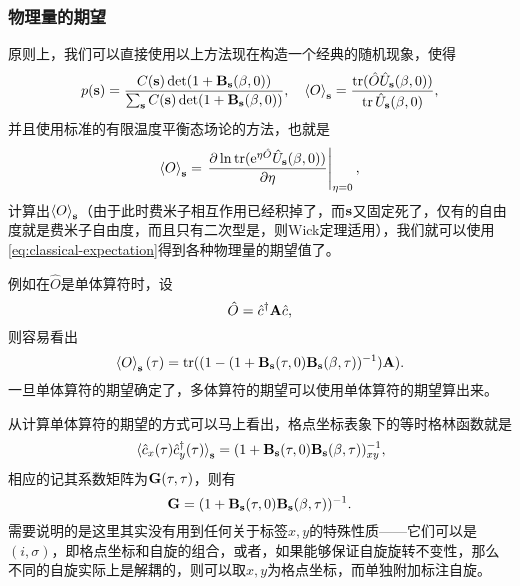 \documentclass[hyperref, UTF8, a4paper]{ctexart}
\newcommand*{\ee}{\mathrm{e}}
\begin{document}
\subsubsection{物理量的期望}

原则上，我们可以直接使用以上方法现在构造一个经典的随机现象，使得
\begin{equation}
    p(\vb{s}) = \frac{ C(\vb{s}) \det(1 + \vb{B}_{\vb{s}}(\beta, 0))}{\sum_{\vb{s}} C(\vb{s}) \det(1 + \vb{B}_{\vb{s}}(\beta, 0))}, \quad \expval{O}_{\vb{s}} = \frac{\trace(\hat{O} \hat{U}_{\vb{s}}(\beta, 0))}{\trace \hat{U}_{\vb{s}}(\beta, 0)},
    \label{eq:ftqmc-prob}
\end{equation}
并且使用标准的有限温度平衡态场论的方法，也就是
\begin{equation}
    \expval{O}_{\vb{s}} = \eval{\pdv{\ln \trace(\ee^{\eta \hat{O}} \hat{U}_{\vb{s}}(\beta, 0))}{\eta}}_{\eta=0},
\end{equation}
计算出$\expval{O}_{\vb{s}}$（由于此时费米子相互作用已经积掉了，而$\vb{s}$又固定死了，仅有的自由度就是费米子自由度，而且只有二次型是，则Wick定理适用），我们就可以使用\eqref{eq:classical-expectation}得到各种物理量的期望值了。

例如在$\hat{O}$是单体算符时，设
\begin{equation}
    \hat{O} = \hat{c}^\dagger \vb{A} \hat{c},
\end{equation}
则容易看出
\begin{equation}
    \expval{O}_{\vb{s}}(\tau) = \trace((1 - (1+ \vb{B}_{\vb{s}}(\tau, 0) \vb{B}_{\vb{s}}(\beta, \tau))^{-1}) \vb{A}).
\end{equation}
一旦单体算符的期望确定了，多体算符的期望可以使用单体算符的期望算出来。

从计算单体算符的期望的方式可以马上看出，格点坐标表象下的等时格林函数就是
\begin{equation}
    \expval*{\hat{c}_x(\tau) \hat{c}^\dagger_y(\tau)}_{\vb{s}} = (1+ \vb{B}_{\vb{s}}(\tau, 0) \vb{B}_{\vb{s}}(\beta, \tau))^{-1}_{xy},
\end{equation}
相应的记其系数矩阵为$\vb{G}(\tau, \tau)$，则有
\begin{equation}
    \vb{G} = (1+ \vb{B}_{\vb{s}}(\tau, 0) \vb{B}_{\vb{s}}(\beta, \tau))^{-1}.
\end{equation}
需要说明的是这里其实没有用到任何关于标签$x, y$的特殊性质——它们可以是$(i, \sigma)$，即格点坐标和自旋的组合，或者，如果能够保证自旋旋转不变性，那么不同的自旋实际上是解耦的，则可以取$x, y$为格点坐标，而单独附加标注自旋。
\end{document}
